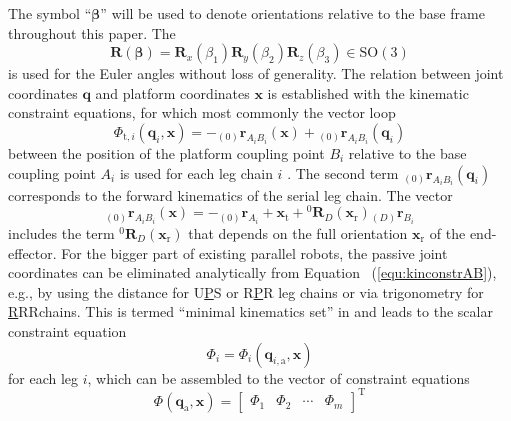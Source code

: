 \documentclass[robotics,article,accept,moreauthors,pdftex]{Definitions/mdpi}
\newcommand{\bm}[1]{\boldsymbol{#1}}
\newcommand{\ortvek}[4]{{ }_{(#1)}{\boldsymbol{#2}}^{#3}_{#4} }
\newcommand{\rotmat}[2]{{{ }^{#1}\boldsymbol{R}}_{#2}}
\newcommand{\transp}[0]{{\mathrm{T}}}
\let\Phi\varPhi
\begin{document}
The symbol ``$\bm{\beta}$'' will be used to denote orientations relative to the base frame throughout this paper.
The 
%
\begin{equation}
\bm{R}(\bm{\beta}) = \bm{R}_x(\beta_1) \bm{R}_y(\beta_2) \bm{R}_z(\beta_3) \in \mathrm{SO(3)}
\label{equ:def_rmat_xyz}
\end{equation}
%
is used for the Euler angles without loss of generality.
%
The relation between joint coordinates $\bm{q}$ and platform coordinates $\bm{x}$ is established with the kinematic constraint equations, for which most commonly the vector loop
%
\begin{equation}
\bm{\Phi}_{\mathrm{t},i}(\bm{q}_i,\bm{x}) = - \ortvek{0}{r}{}{A_iB_i}(\bm{x}) + \ortvek{0}{r}{}{A_iB_i}(\bm{q}_i) 
\label{equ:kinconstrAB}
\end{equation}
%
between the position of the platform coupling point $B_i$ relative to the base coupling point $A_i$ is used for each leg chain $i$ \cite{Merlet2006}.
The second term $\ortvek{0}{r}{}{A_iB_i}(\bm{q}_i)$ corresponds to the forward kinematics of the serial leg chain. 
The vector
\begin{equation}
\ortvek{0}{r}{}{A_iB_i}(\bm{x}) = 
- \ortvek{0}{r}{}{A_i}
+ \bm{x}_{\mathrm{t}} + \rotmat{0}{D}(\bm{x}_{\mathrm{r}}) \ortvek{D}{r}{}{B_i}
\label{equ:vec_AB}
\end{equation}
%
includes the term $\rotmat{0}{D}(\bm{x}_{\mathrm{r}})$ that depends on the full orientation $\bm{x}_{\mathrm{r}}$ of the end-effector.
%
For the bigger part of existing parallel robots, the passive joint coordinates can be eliminated analytically from Equation~ (\ref{equ:kinconstrAB}), e.g., by using the  distance for U\underline{P}S or R\underline{P}R leg chains or via trigonometry for \underline{R}RR\replaced[id=Sp]{ }{-}chains.
This is termed ``minimal kinematics set'' in \cite{Merlet2006} and leads to the scalar constraint equation
%
\begin{equation}
\Phi_{i}
=
\Phi_{i}(\bm{q}_{i,\mathrm{a}},\bm{x})
\label{equ:constr_scalar}
\end{equation}
%
for each leg $i$, which can be assembled to the vector of constraint equations
%
\begin{equation}
\bm{\Phi}(\bm{q}_{\mathrm{a}},\bm{x})
=
\begin{bmatrix}
\Phi_1 & \Phi_2 & \cdots & \Phi_m
\end{bmatrix}^\transp
\label{equ:constr_qa}
\end{equation}
\end{document}
